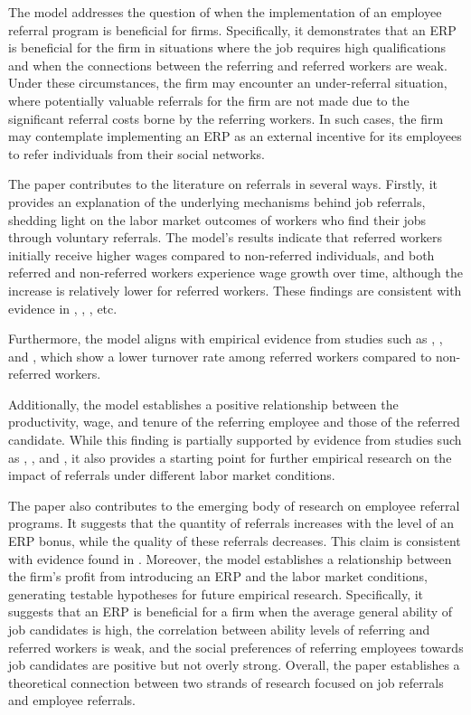 \documentclass[12pt]{article}
\begin{document}
The model addresses the question of when the implementation of an employee referral program is beneficial for firms. Specifically, it demonstrates that an ERP is beneficial for the firm in situations where the job requires high qualifications and when the connections between the referring and referred workers are weak. Under these circumstances, the firm may encounter an under-referral situation, where potentially valuable referrals for the firm are not made due to the significant referral costs borne by the referring workers. In such cases, the firm may contemplate implementing an ERP as an external incentive for its employees to refer individuals from their social networks.

The paper contributes to the literature on referrals in several ways. Firstly, it provides an explanation of the underlying mechanisms behind job referrals, shedding light on the labor market outcomes of workers who find their jobs through voluntary referrals. The model's results indicate that referred workers initially receive higher wages compared to non-referred individuals, and both referred and non-referred workers experience wage growth over time, although the increase is relatively lower for referred workers. These findings are consistent with evidence in \cite{corcoran1980most}, \cite{montgomery1991social}, \cite{dustmann2016referral}, etc.

Furthermore, the model aligns with empirical evidence from studies such as \cite{pallais2016referential}, \cite{lalanne2016old}, and \cite{lalanne2021social}, which show a lower turnover rate among referred workers compared to non-referred workers.

Additionally, the model establishes a positive relationship between the productivity, wage, and tenure of the referring employee and those of the referred candidate. While this finding is partially supported by evidence from studies such as \cite{kugler2003employee}, \cite{lalanne2016old}, and \cite{levati2020impact}, it also provides a starting point for further empirical research on the impact of referrals under different labor market conditions.

The paper also contributes to the emerging body of research on employee referral programs. It suggests that the quantity of referrals increases with the level of an ERP bonus, while the quality of these referrals decreases. This claim is consistent with evidence found in \cite{friebel2023employee}. Moreover, the model establishes a relationship between the firm's profit from introducing an ERP and the labor market conditions, generating testable hypotheses for future empirical research. Specifically, it suggests that an ERP is beneficial for a firm when the average general ability of job candidates is high, the correlation between ability levels of referring and referred workers is weak, and the social preferences of referring employees towards job candidates are positive but not overly strong. Overall, the paper establishes a theoretical connection between two strands of research focused on job referrals and employee referrals.
\end{document}
